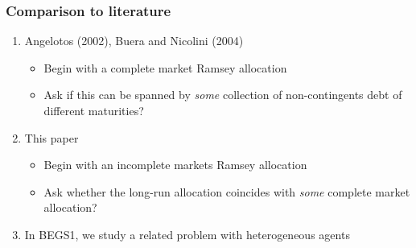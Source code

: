 \documentclass{beamer}
\begin{document}
\begin{frame}
 \frametitle{Comparison to literature}
 \begin{enumerate}
  \item Angelotos (2002), Buera and Nicolini (2004)

\begin{itemize}
 \item Begin with a complete market  Ramsey allocation
 \item Ask if this can be spanned by \emph{some} collection of non-contingents debt of different maturities?
\end{itemize}
\item This paper
\begin{itemize}
 \item Begin with an incomplete markets Ramsey allocation
 \item Ask whether the long-run allocation coincides with \emph{some} complete market allocation?
\end{itemize}

\item In BEGS1, we study a related problem with heterogeneous agents




 \end{enumerate}


\end{frame}
\end{document}
